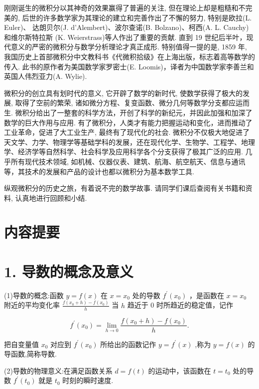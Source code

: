 \documentclass[10pt]{article}
\begin{document}
刚刚诞生的微积分以其神奇的效果赢得了普遍的关注, 但在理论上却是粗糙和不完美的, 后世的许多数学家为其理论的建立和完善作出了不懈的努力, 特别是欧拉(L. Euler)、 达朗贝尔(J. d'Alembert)、波尔查诺(B. Bolzano)、柯西(A. L. Cauchy)和维尔斯特拉斯 (K. Weierstrass)等人作出了重要的贡献. 直到 19 世纪后半叶，现代意义的严密的微积分与数学分析理论才真正成形. 特别值得一提的是, 1859 年, 我国历史上首部微积分中文教科书《代微积拾级》在上海出版，标志着高等数学的传入. 此书的原作者为美国数学家罗密士(E. Loomis)，译者为中国数学家李善兰和英国人伟烈亚力(A. Wylie).

微积分的创立具有划时代的意义, 它开辟了数学的新时代, 使数学获得了极大的发展, 取得了空前的繁荣, 诸如微分方程、复变函数、微分几何等数学分支都应运而生. 微积分给出了一整套的科学方法，开创了科学的新纪元，并因此加强和加深了数学的巨大作用与应用. 有了微积分，人类才有能力把握运动和变化，进而推动了工业革命，促进了大工业生产, 最终有了现代化的社会. 微积分不仅极大地促进了天文学、力学、物理学等基础学科的发展，还在现代化学、生物学、工程学、地理学、经济学等自然科学、社会科学及应用科学各个分支获得了极其广泛的应用. 几乎所有现代技术领域, 如机械、仪器仪表、建筑、航海、航空航天、信息与通讯等，其技术的发展和产品的设计也都以微积分为基本数学工具.

纵观微积分的历史之旅，有着说不完的数学故事. 请同学们课后查阅有关书籍和资料, 认真地进行回顾和小结.

\section*{内容提要}

\section*{1. 导数的概念及意义}

(1)导数的概念:函数 \(y = f\left( x\right)\) 在 \(x = {x}_{0}\) 处的导数 \({f}^{\prime }\left( {x}_{0}\right)\) ，是函数在 \(x = {x}_{0}\) 附近的平均变化率 \(\frac{f\left( {{x}_{0} + h}\right)  - f\left( {x}_{0}\right) }{h}\) 当 \(h\) 趋近于 0 时所趋近的稳定值，记作

\[
{f}^{\prime }\left( {x}_{0}\right)  = \mathop{\lim }\limits_{{h \rightarrow  0}}\frac{f\left( {{x}_{0} + h}\right)  - f\left( {x}_{0}\right) }{h}.
\]

把自变量值 \({x}_{0}\) 对应到 \({f}^{\prime }\left( {x}_{0}\right)\) 所给出的函数记作 \(y = {f}^{\prime }\left( x\right)\) ,称为 \(y = f\left( x\right)\) 的导函数,简称导数.

(2)导数的物理意义:在满足函数关系 \(d = f\left( t\right)\) 的运动中，该函数在 \(t = {t}_{0}\) 处的导数 \({f}^{\prime }\left( {t}_{0}\right)\) 就是 \({t}_{0}\) 时刻的瞬时速度.
\end{document}
